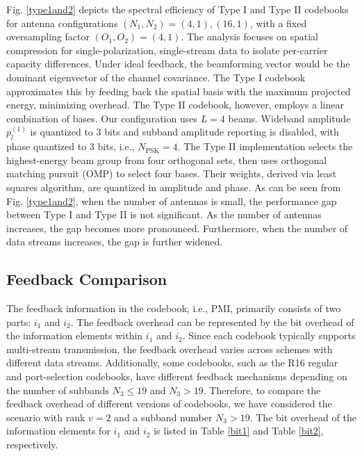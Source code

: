 \documentclass[lettersize,journal]{IEEEtran}
\begin{document}
Fig. \ref{type1and2} depicts the spectral efficiency of Type I and Type II codebooks for antenna configurations \( (N_1, N_2) = (4,1), (16,1) \), with a fixed oversampling factor \( (O_1, O_2) = (4,1) \). The analysis focuses on spatial compression for single-polarization, single-stream data to isolate per-carrier capacity differences. Under ideal feedback, the beamforming vector would be the dominant eigenvector of the channel covariance. The Type I codebook approximates this by feeding back the spatial basis with the maximum projected energy, minimizing overhead. The Type II codebook, however, employs a linear combination of bases. Our configuration uses \( L=4 \) beams. Wideband amplitude \( p^{(1)}_{l} \) is quantized to $3$ bits and subband amplitude reporting is disabled, with phase quantized to 3 bits, i.e., \( N_{\text{PSK}}=4 \). The Type II implementation selects the highest-energy beam group from four orthogonal sets, then uses orthogonal matching pursuit (OMP) to select four bases. Their weights, derived via least squares algorithm, are quantized in amplitude and phase. As can be seen from Fig. \ref{type1and2}, when the number of antennas is small, the performance gap between Type I and Type II is not significant. As the number of antennas increases, the gap becomes more pronounced. Furthermore, when the number of data streams increases, the gap is further widened.



\subsection{Feedback Comparison}
The feedback information in the codebook, i.e., PMI, primarily consists of two parts: $i_1$ and $i_2$. The feedback overhead can be represented by the bit overhead of the information elements within $i_1$ and $i_2$. Since each codebook typically supports multi-stream transmission, the feedback overhead varies across schemes with different data streams. Additionally, some codebooks, such as the R16 regular and port-selection codebooks, have different feedback mechanisms depending on the number of subbands $N_3 \leq 19$ and $N_3 > 19$. Therefore, to compare the feedback overhead of different versions of codebooks, we have considered the scenario with rank $v = 2$ and a subband number $N_3 > 19$. The bit overhead of the information elements for $i_1$ and $i_2$ is listed in Table \ref{bit1} and Table {\ref{bit2}}, respectively.
\end{document}
